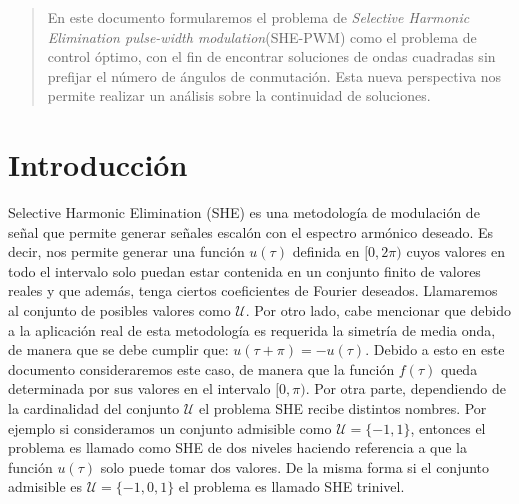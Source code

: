 
\begin{abstract}
    En este documento formularemos el problema de \emph{Selective Harmonic Elimination pulse-width modulation}(SHE-PWM) como el problema de control óptimo, con el fin de encontrar soluciones de ondas cuadradas sin prefijar el número de ángulos de conmutación. 
    Esta nueva perspectiva nos permite realizar un análisis sobre la continuidad de soluciones.
\end{abstract}
\tableofcontents


\section{Introducción} 
 

Selective Harmonic Elimination (SHE) es una metodología de modulación de señal que permite generar señales escalón con el espectro armónico deseado. 
%
Es decir, nos permite generar una función $u(\tau)$ definida en $[0,2\pi)$ cuyos valores en todo el intervalo solo puedan estar contenida en un conjunto  finito de valores reales y que además, tenga ciertos coeficientes de Fourier deseados. 
%
Llamaremos al conjunto de posibles valores como $\mathcal{U}$. 
%
Por otro lado, cabe mencionar que debido a la aplicación real de esta metodología es requerida la simetría de media onda, de manera que se debe cumplir que: $u(\tau + \pi) = -u(\tau)$.
%
Debido a esto en este documento consideraremos este caso, de manera que la función $f(\tau)$ queda determinada por sus valores en el intervalo $[0,\pi)$. 
% 
Por otra parte, dependiendo de la cardinalidad del conjunto $\mathcal{U}$ el problema SHE recibe distintos nombres. 
%
Por ejemplo si consideramos un conjunto admisible como $\mathcal{U} = \{-1,1\}$, entonces el problema es llamado como SHE de dos niveles haciendo referencia a que la función $u(\tau)$ solo puede tomar dos valores. 
%  
De la misma forma si el conjunto admisible es $\mathcal{U} = \{-1,0,1\}$ el problema es llamado SHE trinivel. 
%
\newline 

